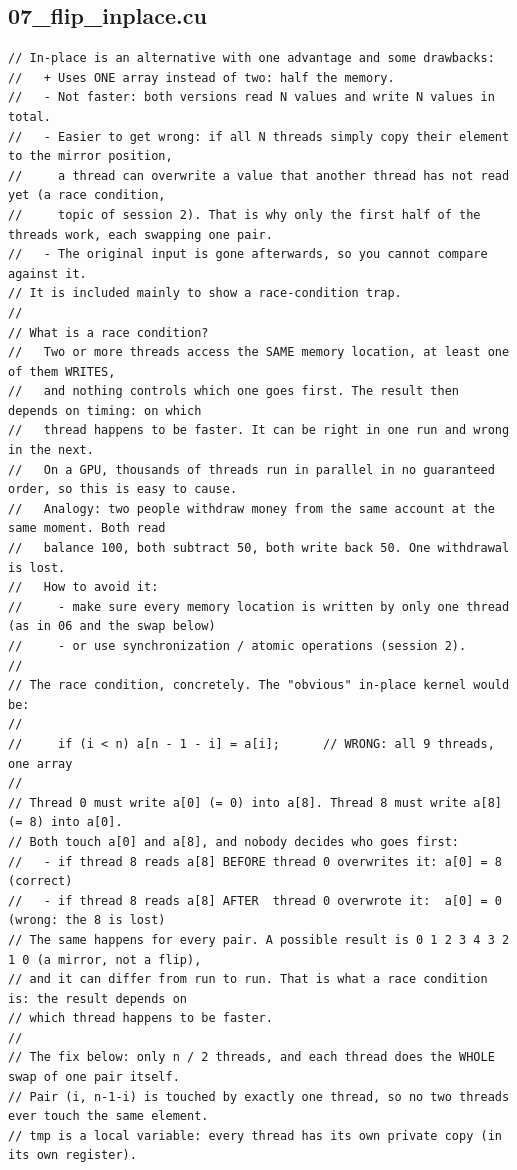 \documentclass[11pt,a4paper]{article}
\begin{document}
\subsection{07\_flip\_inplace.cu}
\begin{lstlisting}[language=CUDA]
// In-place is an alternative with one advantage and some drawbacks:
//   + Uses ONE array instead of two: half the memory.
//   - Not faster: both versions read N values and write N values in total.
//   - Easier to get wrong: if all N threads simply copy their element to the mirror position,
//     a thread can overwrite a value that another thread has not read yet (a race condition,
//     topic of session 2). That is why only the first half of the threads work, each swapping one pair.
//   - The original input is gone afterwards, so you cannot compare against it.
// It is included mainly to show a race-condition trap.
//
// What is a race condition?
//   Two or more threads access the SAME memory location, at least one of them WRITES,
//   and nothing controls which one goes first. The result then depends on timing: on which
//   thread happens to be faster. It can be right in one run and wrong in the next.
//   On a GPU, thousands of threads run in parallel in no guaranteed order, so this is easy to cause.
//   Analogy: two people withdraw money from the same account at the same moment. Both read
//   balance 100, both subtract 50, both write back 50. One withdrawal is lost.
//   How to avoid it:
//     - make sure every memory location is written by only one thread (as in 06 and the swap below)
//     - or use synchronization / atomic operations (session 2).
//
// The race condition, concretely. The "obvious" in-place kernel would be:
//
//     if (i < n) a[n - 1 - i] = a[i];      // WRONG: all 9 threads, one array
//
// Thread 0 must write a[0] (= 0) into a[8]. Thread 8 must write a[8] (= 8) into a[0].
// Both touch a[0] and a[8], and nobody decides who goes first:
//   - if thread 8 reads a[8] BEFORE thread 0 overwrites it: a[0] = 8   (correct)
//   - if thread 8 reads a[8] AFTER  thread 0 overwrote it:  a[0] = 0   (wrong: the 8 is lost)
// The same happens for every pair. A possible result is 0 1 2 3 4 3 2 1 0 (a mirror, not a flip),
// and it can differ from run to run. That is what a race condition is: the result depends on
// which thread happens to be faster.
//
// The fix below: only n / 2 threads, and each thread does the WHOLE swap of one pair itself.
// Pair (i, n-1-i) is touched by exactly one thread, so no two threads ever touch the same element.
// tmp is a local variable: every thread has its own private copy (in its own register).


\end{lstlisting}
\end{document}
